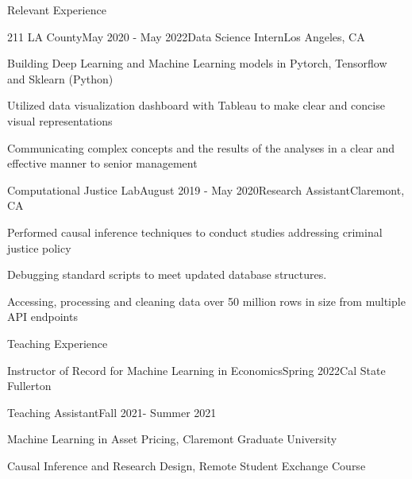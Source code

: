 \documentclass{resume} %
\begin{document}
\begin{rSection}{Relevant Experience}
\begin{rSubsection}{211 LA County}{May 2020 - May 2022}{Data Science Intern}{Los Angeles, CA}
\item Building Deep Learning and Machine Learning models in Pytorch,
Tensorflow and Sklearn (Python)
\item Utilized data visualization dashboard with Tableau to make clear and concise visual representations
\item Communicating complex concepts and the results of the analyses in a clear and effective manner to senior management
\end{rSubsection}
\begin{rSubsection}{Computational Justice Lab}{August 2019 - May 2020}{Research Assistant}{Claremont, CA}
\item Performed causal inference techniques to conduct studies addressing criminal justice policy
\item Debugging standard scripts to meet updated database
structures.
\item Accessing, processing and cleaning data over 50 million rows in size from multiple API endpoints
\end{rSubsection}
\end{rSection}

\begin{rSection}{Teaching Experience}
\begin{rSubsection}{Instructor of Record for Machine Learning in Economics}{Spring 2022}{Cal State Fullerton}{}



\vspace{-.1cm}
\vspace{-0.7cm}
\item[]
\end{rSubsection}

\begin{rSubsection}{Teaching Assistant}{Fall 2021- Summer 2021}{}{}

\item Machine Learning in Asset Pricing, Claremont Graduate University
\item Causal Inference and Research Design, Remote Student Exchange Course

\vspace{-0.7cm}
\item[]
\end{rSubsection}
\end{rSection}
\end{document}
